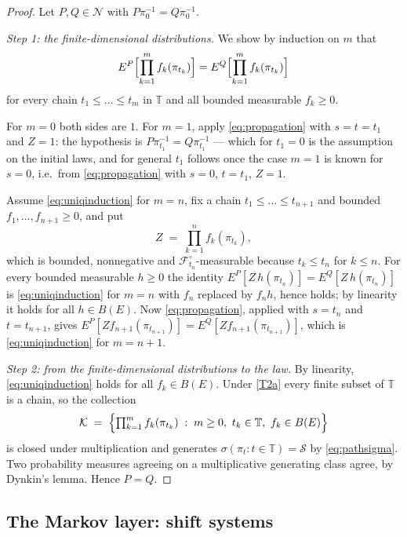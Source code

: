 \documentclass[11pt,a4paper]{article}
\theoremstyle{plain}
\theoremstyle{definition}
\theoremstyle{remark}
\newcommand{\T}{\mathbb{T}}                     %
\newcommand{\Bdd}{B}                           %
\newcommand{\Filt}{\mathcal{F}}
\begin{document}
\begin{proof}
  Let $P, Q \in \mathcal{N}$ with $P\pi_0^{-1} = Q\pi_0^{-1}$.

  \emph{Step 1: the finite-dimensional distributions.}  We show by induction on
  $m$ that
  \begin{equation}
    \label{eq:uniqinduction}
    E^P\Bigl[ \prod_{k=1}^m f_k(\pi_{t_k}) \Bigr]
      = E^Q\Bigl[ \prod_{k=1}^m f_k(\pi_{t_k}) \Bigr]
  \end{equation}
  for every chain $t_1 \leq \dots \leq t_m$ in $\T$ and all bounded measurable
  $f_k \geq 0$.

  For $m = 0$ both sides are $1$.  For $m = 1$, apply \eqref{eq:propagation} with
  $s = t = t_1$ and $Z = 1$: the hypothesis is $P\pi_{t_1}^{-1} = Q\pi_{t_1}^{-1}$
  --- which for $t_1 = 0$ is the assumption on the initial laws, and for general
  $t_1$ follows once the case $m=1$ is known for $s = 0$, i.e.\ from
  \eqref{eq:propagation} with $s = 0$, $t = t_1$, $Z = 1$.

  Assume \eqref{eq:uniqinduction} for $m = n$, fix a chain
  $t_1 \leq \dots \leq t_{n+1}$ and bounded $f_1,\dots,f_{n+1} \geq 0$, and put
  \[
    Z \;=\; \prod_{k=1}^n f_k(\pi_{t_k}) ,
  \]
  which is bounded, nonnegative and $\Filt^\circ_{t_n}$-measurable because
  $t_k \leq t_n$ for $k \leq n$.  For every bounded measurable $h \geq 0$ the
  identity $E^P[Z\,h(\pi_{t_n})] = E^Q[Z\,h(\pi_{t_n})]$ is
  \eqref{eq:uniqinduction} for $m = n$ with $f_n$ replaced by $f_n h$, hence
  holds; by linearity it holds for all $h \in \Bdd(E)$.  Now
  \eqref{eq:propagation}, applied with $s = t_n$ and $t = t_{n+1}$, gives
  $E^P[Z f_{n+1}(\pi_{t_{n+1}})] = E^Q[Z f_{n+1}(\pi_{t_{n+1}})]$, which is
  \eqref{eq:uniqinduction} for $m = n+1$.

  \emph{Step 2: from the finite-dimensional distributions to the law.}  By
  linearity, \eqref{eq:uniqinduction} holds for all $f_k \in \Bdd(E)$.  Under
  \eqref{T2a} every finite subset of $\T$ is a chain, so the collection
  \[
    \mathcal{K} \;=\; \Bigl\{ \textstyle\prod_{k=1}^m f_k(\pi_{t_k}) \;:\;
      m \geq 0,\ t_k \in \T,\ f_k \in \Bdd(E) \Bigr\}
  \]
  is closed under multiplication and generates
  $\sigma(\pi_t : t \in \T) = \mathcal{S}$ by \eqref{eq:pathsigma}.  Two
  probability measures agreeing on a multiplicative generating class agree, by
  Dynkin's lemma.  Hence $P = Q$.
\end{proof}


\subsection{The Markov layer: shift systems}
\label{ssec:markovlayer}
\end{document}
